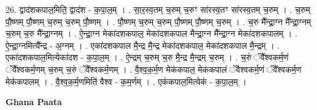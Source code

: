 \documentclass[17pt]{extarticle}
\begin{document}
26. द्वाद॑शकपाल॒मिति॒ द्वाद॑श - क॒पा॒ल॒म् । . सा॒र॒स्व॒तम् च॒रुम् च॒रुꣳ सा॑रस्व॒तꣳ सा॑रस्व॒तम् च॒रुम् । . च॒रुम् पौ॒ष्णम् पौ॒ष्णम् च॒रुम् च॒रुम् पौ॒ष्णम् । . पौ॒ष्णम् च॒रुम् च॒रुम् पौ॒ष्णम् पौ॒ष्णम् च॒रुम् । . च॒रु मै᳚न्द्रा॒ग्न मै᳚न्द्रा॒ग्नम् च॒रुम् च॒रु मै᳚न्द्रा॒ग्नम् । . ऐ॒न्द्रा॒ग्न मेका॑दशकपाल॒ मेका॑दशकपाल मैन्द्रा॒ग्न मै᳚न्द्रा॒ग्न मेका॑दशकपालम् । . ऐ॒न्द्रा॒ग्नमित्यै᳚न्द्र - अ॒ग्नम् । . एका॑दशकपाल मै॒न्द्र मै॒न्द्र मेका॑दशकपाल॒ मेका॑दशकपाल मै॒न्द्रम् । . एका॑दशकपाल॒मित्येका॑दश - क॒पा॒ल॒म् । . ऐ॒न्द्रम् च॒रुम् च॒रु मै॒न्द्र मै॒न्द्रम् च॒रुम् । . च॒रुं ॅवै᳚श्वकर्म॒णं ॅवै᳚श्वकर्म॒णम् च॒रुम् च॒रुं ॅवै᳚श्वकर्म॒णम् । . वै॒श्व॒क॒र्म॒ण मेक॑कपाल॒ मेक॑कपालं ॅवैश्वकर्म॒णं ॅवै᳚श्वकर्म॒ण मेक॑कपालम् । . वै॒श्व॒क॒र्म॒णमिति॑ वैश्व - क॒म॒र्णम् । . एक॑कपाल॒मित्येक॑ - क॒पा॒ल॒म् । \newline

\textbf{Ghana Paata } \newline
\end{document}
